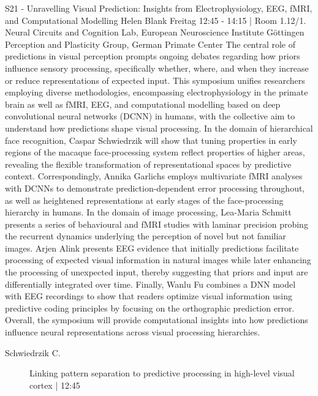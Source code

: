 
            \begin{symposium}
            {S21 - Unravelling Visual Prediction: Insights from Electrophysiology, EEG, fMRI, and Computational Modelling}
            {Helen Blank}
            {Freitag 12:45 - 14:15 | Room 1.12/1.}
            {Neural Circuits and Cognition Lab, European Neuroscience Institute Göttingen Perception and Plasticity Group, German Primate Center}
            The central role of predictions in visual perception prompts ongoing debates regarding how priors influence sensory processing, specifically whether, where, and when they increase or reduce representations of expected input. This symposium unifies researchers employing diverse methodologies, encompassing electrophysiology in the primate brain as well as fMRI, EEG, and computational modelling based on deep convolutional neural networks (DCNN) in humans, with the collective aim to understand how predictions shape visual processing.
In the domain of hierarchical face recognition, Caspar Schwiedrzik will show that tuning properties in early regions of the macaque face-processing system reflect properties of higher areas, revealing the flexible transformation of representational spaces by predictive context. Correspondingly, Annika Garlichs employs multivariate fMRI analyses with DCNNs to demonstrate prediction-dependent error processing throughout, as well as heightened representations at early stages of the face-processing hierarchy in humans. In the domain of image processing, Lea-Maria Schmitt presents a series of behavioural and fMRI studies with laminar precision probing the recurrent dynamics underlying the perception of novel but not familiar images. Arjen Alink presents EEG evidence that initially predictions facilitate processing of expected visual information in natural images while later enhancing the processing of unexpected input, thereby suggesting that priors and input are differentially integrated over time. Finally, Wanlu Fu combines a DNN model with EEG recordings to show that readers optimize visual information using predictive coding principles by focusing on the orthographic prediction error. Overall, the symposium will provide computational insights into how predictions influence neural representations across visual processing hierarchies.
            \begin{description}    
            
                \item [ Schwiedrzik C.] Linking pattern separation to predictive processing in high-level visual cortex  \textcolor{mygray}{ | 12:45}    
                

\end{description}
\end{symposium}
